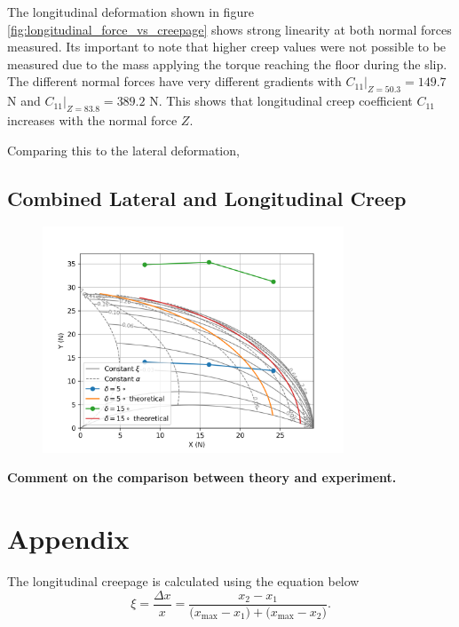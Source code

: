 \documentclass{article}
\begin{document}
The longitudinal deformation shown in figure \ref{fig:longitudinal_force_vs_creepage} shows strong linearity at both normal forces measured.
Its important to note that higher creep values were not possible to be measured due to the mass applying the torque reaching the floor during the slip.
The different normal forces have very different gradients with $C_{11}|_{Z=50.3} = 149.7$ N and $C_{11}|_{Z=83.8} = 389.2$ N.
This shows that longitudinal creep coefficient $C_{11}$ increases with the normal force $Z$.

Comparing this to the lateral deformation, 

\subsection{\textbf{Combined Lateral and Longitudinal Creep}}

\begin{figure}[H]
    \centering
    \includegraphics[width=0.8\textwidth]{5.3/XvsY.png}
    \caption{}
    \label{fig:lateral_force_vs_longitudinal_force}
\end{figure}

\begin{center}
    \textbf{Comment on the comparison between theory and experiment.}
\end{center}

\section{Appendix}

The longitudinal creepage is calculated using the equation below
\begin{equation}
    \xi = \frac{\Delta x}{x} 
     = \frac{x_{2} - x_{1}}
            {\bigl(x_{\max} - x_{1}\bigr) + \bigl(x_{\max} - x_{2}\bigr)}.
\end{equation}
\end{document}
